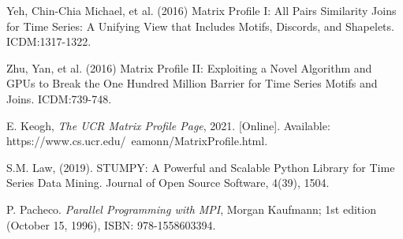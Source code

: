 \documentclass[conference]{IEEEtran}
\begin{document}
\begin{thebibliography}{5}  

 Yeh, Chin-Chia Michael, et al. (2016) Matrix Profile I: All Pairs Similarity Joins for Time Series: A Unifying View that Includes Motifs, Discords, and Shapelets. ICDM:1317-1322.

 Zhu, Yan, et al. (2016) Matrix Profile II: Exploiting a Novel Algorithm and GPUs to Break the One Hundred Million Barrier for Time Series Motifs and Joins. ICDM:739-748.

 E. Keogh, \emph{The UCR Matrix Profile Page}, 2021. [Online]. Available: https://www.cs.ucr.edu/~eamonn/MatrixProfile.html.

 S.M. Law, (2019). STUMPY: A Powerful and Scalable Python Library for Time Series Data Mining. Journal of Open Source Software, 4(39), 1504.

 P. Pacheco. \emph{Parallel Programming with MPI}, Morgan Kaufmann; 1st edition (October 15, 1996), ISBN: 978-1558603394.

\end{thebibliography}
\end{document}
